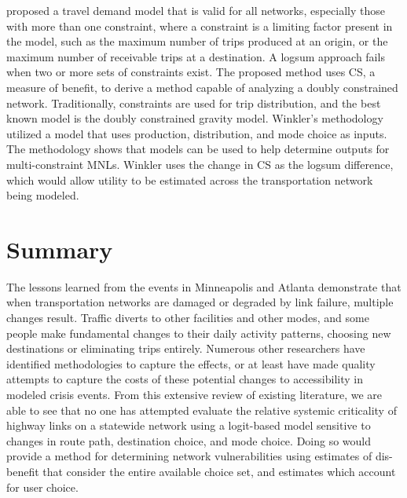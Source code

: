 \citet{winkler2016} proposed a travel demand model that is valid for all
networks,
especially those with more than one constraint, where a constraint is a limiting factor
present in the model, such as the maximum number of trips produced at an origin, or
the maximum number of receivable trips at a destination. A logsum approach fails when two
or more sets of constraints exist. The proposed method uses CS, a measure of benefit,
to derive a method capable of analyzing a doubly constrained network. Traditionally,
constraints are used for trip distribution, and the best known model is the doubly constrained
gravity model. Winkler’s methodology utilized a
model that uses production, distribution, and mode choice as inputs. The
methodology shows that models can be used to help determine outputs for
multi-constraint MNLs. Winkler uses the change in CS as the logsum difference, which
would allow utility to be estimated across the transportation network
being modeled.

\section{Summary}

The lessons learned from the events in Minneapolis and Atlanta demonstrate
that when
transportation networks are damaged or degraded by link failure, multiple
changes result. Traffic
diverts to other facilities and other modes, and some people make
fundamental changes to their
daily activity patterns, choosing new destinations or eliminating trips
entirely. Numerous other
researchers have identified methodologies to capture the effects, or at
least have made quality attempts to capture the costs of these
potential changes to accessibility in modeled crisis events.
From this extensive review of existing literature, we are able to see that no
one has attempted evaluate the relative systemic
criticality of highway links on a statewide network using a logit-based model
sensitive to changes in route path, destination choice, and mode choice. Doing so would
provide a method for determining network vulnerabilities using estimates of dis-benefit
that consider the entire available choice set, and estimates which account for user choice. 
